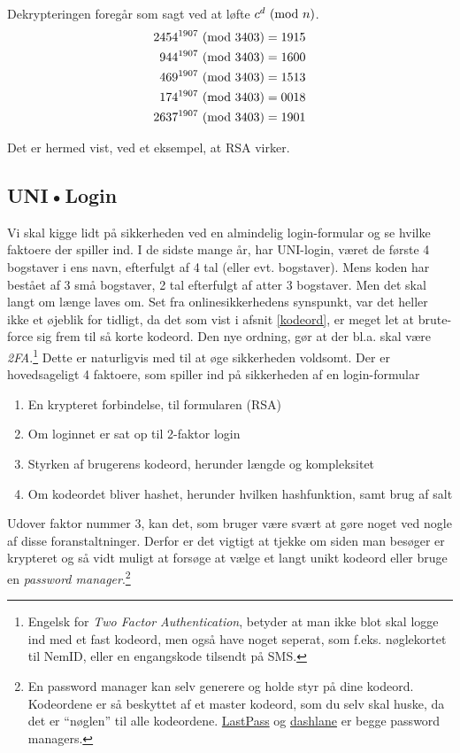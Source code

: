 Dekrypteringen foregår som sagt ved at løfte \(c^d \ (\mathrm{mod}\ n)\).
\begin{align*}
    2454^{1907} \ (\mathrm{mod}\ 3403) &= 1915\\
    944^{1907} \ (\mathrm{mod}\ 3403)  &= 1600\\
    469^{1907} \ (\mathrm{mod}\ 3403)  &= 1513\\
    174^{1907} \ (\mathrm{mod}\ 3403)  &= 0018\\
    2637^{1907} \ (\mathrm{mod}\ 3403) &= 1901
\end{align*}

Det er hermed vist, ved et eksempel, at RSA virker.



\subsection{UNI•Login}
Vi skal kigge lidt på sikkerheden ved en almindelig login-formular og se hvilke faktoere der spiller ind.
I de sidste mange år, har UNI-login, været de første 4 bogstaver i ens navn, efterfulgt af 4 tal (eller evt. bogstaver).
Mens koden har bestået af 3 små bogstaver, 2 tal efterfulgt af atter 3 bogstaver.
Men det skal langt om længe laves om. \cite{unilogin}
Set fra onlinesikkerhedens synspunkt, var det heller ikke et øjeblik for tidligt, da det som vist i afsnit \ref{kodeord}, er meget let at brute-force sig frem til så korte kodeord.
Den nye ordning, gør at der bl.a. skal være \emph{2FA}.\footnote{Engelsk for \emph{Two Factor Authentication}, betyder at man ikke blot skal logge ind med et fast kodeord, men også have noget seperat, som f.eks. nøglekortet til NemID, eller en engangskode tilsendt på SMS.}
Dette er naturligvis med til at øge sikkerheden voldsomt.
Der er hovedsageligt 4 faktoere, som spiller ind på sikkerheden af en login-formular

\begin{enumerate}[noitemsep]
    \item En krypteret forbindelse, til formularen (RSA)
    \item Om loginnet er sat op til 2-faktor login
    \item Styrken af brugerens kodeord, herunder længde og kompleksitet
    \item Om kodeordet bliver hashet, herunder hvilken hashfunktion, samt brug af salt
\end{enumerate}


Udover faktor nummer 3, kan det, som bruger være svært at gøre noget ved nogle af disse foranstaltninger.
Derfor er det vigtigt at tjekke om siden man besøger er krypteret og så vidt muligt at forsøge at vælge et langt unikt kodeord eller bruge en \emph{password manager}.\footnote{En password manager kan selv generere og holde styr på dine kodeord. Kodeordene er så beskyttet af et master kodeord, som du selv skal huske, da det er ``nøglen'' til alle kodeordene. \href{https://www.lastpass.com/}{LastPass} og \href{https://www.dashlane.com/}{dashlane} er begge password managers.}

